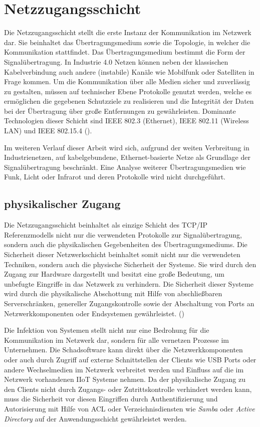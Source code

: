 \section{Netzzugangsschicht}
Die Netzzugangsschicht stellt die erste Instanz der Kommunikation im Netzwerk dar. Sie beinhaltet das Übertragungsmedium sowie die Topologie, in welcher die Kommunikation stattfindet. Das Übertragungsmedium bestimmt die Form der Signalübertragung. In Industrie 4.0 Netzen können neben der klassischen Kabelverbindung auch andere (instabile) Kanäle wie Mobilfunk oder Satelliten in Frage kommen. Um die Kommunikation über alle Medien sicher und zuverlässig zu gestalten, müssen auf technischer Ebene Protokolle genutzt werden, welche es ermöglichen die gegebenen Schutzziele zu realisieren und die Integrität der Daten bei der Übertragung über große Entfernungen zu gewährleisten. Dominante Technologien dieser Schicht sind \ac{IEEE} 802.3 (Ethernet), \ac{IEEE} 802.11 (Wireless LAN) und \ac{IEEE} 802.15.4 (\cite{sichKom2017}).

Im weiteren Verlauf dieser Arbeit wird sich, aufgrund der weiten Verbreitung in Industrienetzen, auf kabelgebundene, Ethernet-basierte Netze als Grundlage der Signalübertragung beschränkt. Eine Analyse weiterer Übertragungsmedien wie Funk, Licht oder Infrarot und deren Protokolle wird nicht durchgeführt.

\subsection{physikalischer Zugang}
Die Netzzugangsschicht beinhaltet als einzige Schicht des \ac{TCP}/\ac{IP} Referenzmodells nicht nur die verwendeten Protokolle zur Signalübertragung, sondern auch die physikalischen Gegebenheiten des Übertragungsmediums. Die Sicherheit dieser Netzwerkschicht beinhaltet somit nicht nur die verwendeten Techniken, sondern auch die physische Sicherheit der Systeme. Sie wird durch den Zugang zur Hardware dargestellt und besitzt eine große Bedeutung, um unbefugte Eingriffe in das Netzwerk zu verhindern. Die Sicherheit dieser Systeme wird durch die physikalische Abschottung mit Hilfe von abschließbaren Serverschränken, genereller Zugangskontrolle sowie der Abschaltung von Ports an Netzwerkkomponenten oder Endsystemen gewährleistet. (\cite{sichKom2017})

Die Infektion von Systemen stellt nicht nur eine Bedrohung für die Kommunikation im Netzwerk dar, sondern für alle vernetzen Prozesse im Unternehmen. Die Schadsoftware kann direkt über die Netzwerkkomponenten oder auch durch Zugriff auf externe Schnittstellen der Clients wie \ac{USB} Ports oder andere Wechselmedien im Netzwerk verbreitet werden und Einfluss auf die im Netzwerk vorhandenen \ac{IIoT} Systeme nehmen. Da der physikalische Zugang zu den Clients nicht durch Zugangs- oder Zutrittskontrolle verhindert werden kann, muss die Sicherheit vor diesen Eingriffen durch Authentifizierung und Autorisierung mit Hilfe von \ac{ACL} oder Verzeichnisdiensten wie \textit{Samba} oder \textit{Active Directory} auf der Anwendungsschicht gewährleistet werden.

